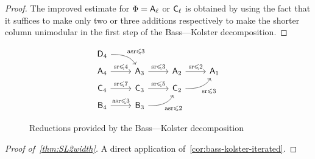 \begin{proof}
The improved estimate for $\Phi=\mathsf{A}_\ell$ or $\mathsf{C}_\ell$ is obtained by using the fact that it suffices to make only two or three additions respectively to make the shorter column unimodular in the first step of the Bass---Kolster decomposition.
\end{proof}
\begin{figure}[htb]\label{fig:bass-kolster}
\[
\begin{tikzcd}[row sep=tiny]
\rD_4 \arrow[out=0,in=120]{rd}{\asr\leqslant3} & & & \\
\rA_4 \arrow{r}{\sr\leqslant4} & \rA_3 \arrow{r}{\sr\leqslant3} & \rA_2 \arrow{r}{\sr\leqslant2} & \rA_1 \\
\rC_4 \arrow{r}{\sr\leqslant7} & \rC_3 \arrow{r}{\sr\leqslant5} & \rC_2 \arrow[out=0,in=-120,swap]{ru}{\sr\leqslant3} \\
\rB_4 \arrow{r}{\asr\leqslant3} & \rB_3 \arrow[out=0,in=-120,swap]{ru}{\asr\leqslant2} & &
\end{tikzcd}
\]
\caption{Reductions provided by the Bass---Kolster decomposition}
\end{figure}

\begin{proof}[Proof of~\cref{thm:SL2width}]
A direct application of~\cref{cor:bass-kolster-iterated}.
\end{proof}
